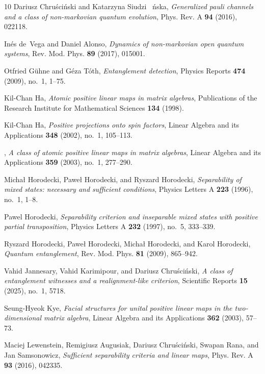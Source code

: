 \documentclass[12pt]{amsart}
\numberwithin{equation}{section}
\begin{document}
\begin{thebibliography}{10}
Dariusz Chru{\'{s}}ci{\'{n}}ski and Katarzyna Siudzi\ifmmode~\else
  \'{n}\fi{}ska, \emph{Generalized pauli channels and a class of non-markovian
  quantum evolution}, Phys. Rev. A \textbf{94} (2016), 022118.

In\'es de~Vega and Daniel Alonso, \emph{Dynamics of non-markovian open quantum
  systems}, Rev. Mod. Phys. \textbf{89} (2017), 015001.

Otfried G\"{u}hne and G\'{e}za T\'{o}th, \emph{Entanglement detection}, Physics
  Reports \textbf{474} (2009), no.~1, 1--75.

Kil-Chan Ha, \emph{Atomic positive linear maps in matrix algebras},
  Publications of the Research Institute for Mathematical Sciences \textbf{134}
  (1998).

Kil-Chan Ha, \emph{Positive projections onto spin factors}, Linear Algebra and
  its Applications \textbf{348} (2002), no.~1, 105--113.

\bysame, \emph{A class of atomic positive linear maps in matrix algebras},
  Linear Algebra and its Applications \textbf{359} (2003), no.~1, 277--290.

Michał Horodecki, Paweł Horodecki, and Ryszard Horodecki, \emph{Separability
  of mixed states: necessary and sufficient conditions}, Physics Letters A
  \textbf{223} (1996), no.~1, 1--8.

Pawel Horodecki, \emph{Separability criterion and inseparable mixed states with
  positive partial transposition}, Physics Letters A \textbf{232} (1997),
  no.~5, 333--339.

Ryszard Horodecki, Pawe\l{} Horodecki, Micha\l{} Horodecki, and Karol
  Horodecki, \emph{Quantum entanglement}, Rev. Mod. Phys. \textbf{81} (2009),
  865--942.

Vahid Jannesary, Vahid Karimipour, and Dariusz Chru{\'s}ci{\'n}ski, \emph{A
  class of entanglement witnesses and a realignment-like criterion}, Scientific
  Reports \textbf{15} (2025), no.~1, 5718.

Seung-Hyeok Kye, \emph{Facial structures for unital positive linear maps in the
  two-dimensional matrix algebra}, Linear Algebra and its Applications
  \textbf{362} (2003), 57--73.

Maciej Lewenstein, Remigiusz Augusiak, Dariusz Chru\'{s}ci\'{n}ski, Swapan
  Rana, and Jan Samsonowicz, \emph{Sufficient separability criteria and linear
  maps}, Phys. Rev. A \textbf{93} (2016), 042335.


\end{thebibliography}
\end{document}
